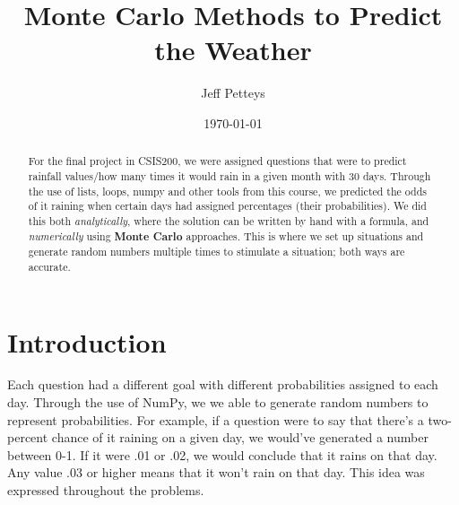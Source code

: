 \documentclass[twocolumn]{revtex4}
\begin{document}
\title{
Monte Carlo Methods to Predict the Weather}



\author{Jeff Petteys}

\date{\today}

\begin{abstract}
    
For the final project in CSIS200, we were assigned questions that were to predict rainfall values/how many times it would rain in a given month with 30 days. Through the use of lists, loops, numpy and other tools from this course, we predicted the odds of it raining when certain days had assigned percentages (their probabilities). We did this both {\it analytically}, where the solution can be written by hand with a formula, and {\it numerically} using {\bf Monte Carlo} approaches. This is where we set up situations and generate random numbers multiple times to stimulate a situation; both ways are accurate.
\end{abstract}

\maketitle

\section{Introduction}
Each question had a different goal with different probabilities assigned to each day. Through the use of NumPy, we we able to generate random numbers to represent probabilities. For example, if a question were to say that there's a two-percent chance of it raining on a given day, we would've generated a number between 0-1. If it were .01 or .02, we would conclude that it rains on that day. Any value .03 or higher means that it won't rain on that day. This idea was expressed throughout the problems.

\end{document}
